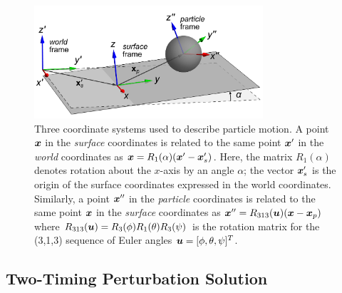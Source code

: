\begin{figure}
    \centering
    \includegraphics[width=8.5cm]{figures/5Coordinates.png}
    \caption{Three coordinate systems used to describe particle motion.\cite{Diebel2006}  A point $\boldsymbol{x}$ in the \emph{surface} coordinates is related to the same point $\boldsymbol{x}'$ in the \emph{world} coordinates as $\boldsymbol{x}=R_1(\alpha) (\boldsymbol{x}'-\boldsymbol{x}'_s)$. Here, the matrix $R_1(\alpha)$ denotes rotation about the $x$-axis by an angle $\alpha$; the vector $\boldsymbol{x}'_s$ is the origin of the surface coordinates expressed in the world coordinates. Similarly, a point $\boldsymbol{x}''$ in the \emph{particle} coordinates is related to the same point $\boldsymbol{x}$ in the \emph{surface} coordinates as $\boldsymbol{x}''=R_{313}(\boldsymbol{u})(\boldsymbol{x}-\boldsymbol{x}_p)$ where $R_{313}(\boldsymbol{u})=R_3(\phi)R_1(\theta)R_3(\psi)$ is the rotation matrix for the (3,1,3) sequence of Euler angles $\boldsymbol{u}=[\phi,\theta,\psi]^T$. }
    \label{fig:Coordinates}
\end{figure}

\subsection{Two-Timing Perturbation Solution}

